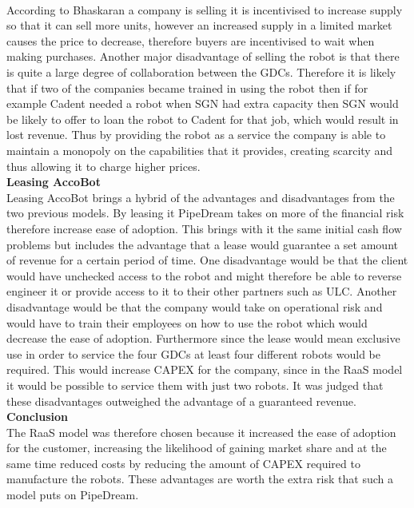 \documentclass[11pt]{article}		%
\newcommand{\supercite}[1]{\textsuperscript{\cite{#1}}}		%
\begin{document}
             According to Bhaskaran\supercite{leasing_strategy} a company is selling it is incentivised to increase supply so that it can sell more units, however an increased supply in a limited market causes the price to decrease, therefore buyers are incentivised to wait when making purchases.
            Another major disadvantage of selling the robot is that there is quite a large degree of collaboration between the GDCs. Therefore it is likely that if two of the companies became trained in using the robot then if for example Cadent needed a robot when SGN had extra capacity then SGN would be likely to offer to loan the robot to Cadent for that job, which would result in lost revenue.
            Thus by providing the robot as a service the company is able to maintain a monopoly on the capabilities that it provides, creating scarcity and thus allowing it to charge higher prices. 
            \\
            \textbf{Leasing AccoBot}
            \\
            Leasing AccoBot brings a hybrid of the advantages and disadvantages from the two previous models. By leasing it PipeDream takes on more of the financial risk therefore increase ease of adoption. This brings with it the same initial cash flow problems but includes the advantage that a lease would guarantee a set amount of revenue for a certain period of time. One disadvantage would be that the client would have unchecked access to the robot and might therefore be able to reverse engineer it or provide access to it to their other partners such as ULC. Another disadvantage would be that the company would take on operational risk and would have to train their employees on how to use the robot which would decrease the ease of adoption. Furthermore since the lease would mean exclusive use in order to service the four GDCs at least four different robots would be required. This would increase CAPEX for the company, since in the RaaS model it would be possible to service them with just two robots. It was judged that these  disadvantages outweighed the advantage of a guaranteed revenue.
            \\
            \textbf{Conclusion}
            \\
            The RaaS model was therefore chosen because it increased the ease of adoption for the customer, increasing the likelihood of gaining market share and at the same time reduced costs by reducing the amount of CAPEX required to manufacture the robots. These advantages are worth the extra risk that such a model puts on PipeDream.
        
\end{document}
